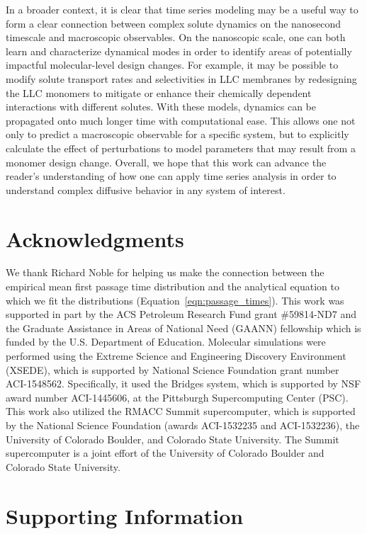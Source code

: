 \documentclass[journal=jctcce,manuscript=article]{achemso}
\begin{document}
  In a broader context, it is clear that time series modeling may be a useful way
  to form a clear connection between complex solute dynamics on the nanosecond 
  timescale and macroscopic observables. On the nanoscopic scale, one can both 
  learn and characterize dynamical modes in order to identify areas of potentially
  impactful molecular-level design changes. For example, it may be possible to 
  modify solute transport rates and selectivities in LLC membranes by redesigning 
  the LLC monomers to mitigate or enhance their chemically dependent interactions
  with different solutes. With these models, dynamics can be propagated onto much 
  longer time with computational ease. This allows one not only to predict a 
  macroscopic observable for a specific system, but to explicitly calculate the 
  effect of perturbations to model parameters that may result from a monomer 
  design change. Overall, we hope that this work can advance the reader's 
  understanding of how one can apply time series analysis in order to understand 
  complex diffusive behavior in any system of interest.

  \section*{Acknowledgments}
  
  We thank Richard Noble for helping us make the connection between the empirical 
  mean first passage time distribution and the analytical equation to which we fit
  the distributions (Equation~\ref{eqn:passage_times}).
  This work was supported in part by the ACS Petroleum Research Fund grant
  \#59814-ND7 and the Graduate Assistance in Areas of National Need (GAANN)
  fellowship which is funded by the U.S. Department of Education.  Molecular
  simulations were performed using the Extreme Science and Engineering
  Discovery Environment (XSEDE), which is supported by National Science
  Foundation grant number ACI-1548562. Specifically, it used the Bridges
  system, which is supported by NSF award number ACI-1445606, at the Pittsburgh
  Supercomputing Center (PSC). This work also utilized the RMACC Summit
  supercomputer, which is supported by the National Science Foundation (awards
  ACI-1532235 and ACI-1532236), the University of Colorado Boulder, and
  Colorado State University. The Summit supercomputer is a joint effort of the
  University of Colorado Boulder and Colorado State University.

  \section*{Supporting Information}
\end{document}
